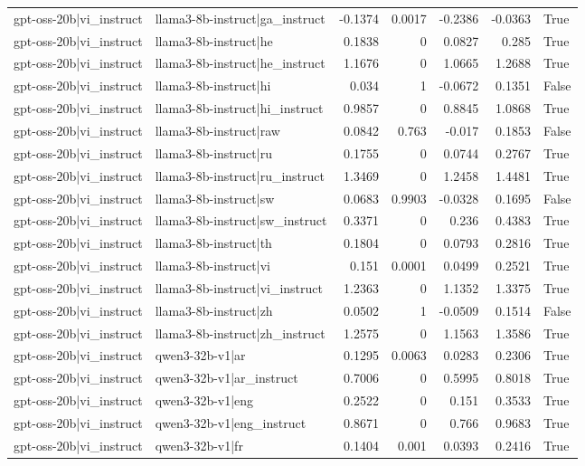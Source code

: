 \begin{table}
\begin{tabular}{l l r r r r l}
gpt-oss-20b|vi_instruct & llama3-8b-instruct|ga_instruct & -0.1374 & 0.0017 & -0.2386 & -0.0363 & True \\
gpt-oss-20b|vi_instruct & llama3-8b-instruct|he & 0.1838 & 0 & 0.0827 & 0.285 & True \\
gpt-oss-20b|vi_instruct & llama3-8b-instruct|he_instruct & 1.1676 & 0 & 1.0665 & 1.2688 & True \\
gpt-oss-20b|vi_instruct & llama3-8b-instruct|hi & 0.034 & 1 & -0.0672 & 0.1351 & False \\
gpt-oss-20b|vi_instruct & llama3-8b-instruct|hi_instruct & 0.9857 & 0 & 0.8845 & 1.0868 & True \\
gpt-oss-20b|vi_instruct & llama3-8b-instruct|raw & 0.0842 & 0.763 & -0.017 & 0.1853 & False \\
gpt-oss-20b|vi_instruct & llama3-8b-instruct|ru & 0.1755 & 0 & 0.0744 & 0.2767 & True \\
gpt-oss-20b|vi_instruct & llama3-8b-instruct|ru_instruct & 1.3469 & 0 & 1.2458 & 1.4481 & True \\
gpt-oss-20b|vi_instruct & llama3-8b-instruct|sw & 0.0683 & 0.9903 & -0.0328 & 0.1695 & False \\
gpt-oss-20b|vi_instruct & llama3-8b-instruct|sw_instruct & 0.3371 & 0 & 0.236 & 0.4383 & True \\
gpt-oss-20b|vi_instruct & llama3-8b-instruct|th & 0.1804 & 0 & 0.0793 & 0.2816 & True \\
gpt-oss-20b|vi_instruct & llama3-8b-instruct|vi & 0.151 & 0.0001 & 0.0499 & 0.2521 & True \\
gpt-oss-20b|vi_instruct & llama3-8b-instruct|vi_instruct & 1.2363 & 0 & 1.1352 & 1.3375 & True \\
gpt-oss-20b|vi_instruct & llama3-8b-instruct|zh & 0.0502 & 1 & -0.0509 & 0.1514 & False \\
gpt-oss-20b|vi_instruct & llama3-8b-instruct|zh_instruct & 1.2575 & 0 & 1.1563 & 1.3586 & True \\
gpt-oss-20b|vi_instruct & qwen3-32b-v1|ar & 0.1295 & 0.0063 & 0.0283 & 0.2306 & True \\
gpt-oss-20b|vi_instruct & qwen3-32b-v1|ar_instruct & 0.7006 & 0 & 0.5995 & 0.8018 & True \\
gpt-oss-20b|vi_instruct & qwen3-32b-v1|eng & 0.2522 & 0 & 0.151 & 0.3533 & True \\
gpt-oss-20b|vi_instruct & qwen3-32b-v1|eng_instruct & 0.8671 & 0 & 0.766 & 0.9683 & True \\
gpt-oss-20b|vi_instruct & qwen3-32b-v1|fr & 0.1404 & 0.001 & 0.0393 & 0.2416 & True \\

\end{tabular}
\end{table}
